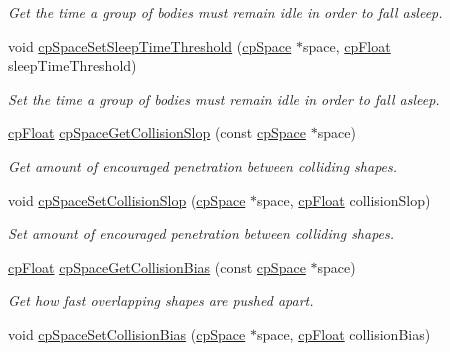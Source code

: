 \begin{DoxyCompactItemize}
\begin{DoxyCompactList}\small\item\em Get the time a group of bodies must remain idle in order to fall asleep. \end{DoxyCompactList}\item 
void \hyperlink{group__cp_space_ga96acf0e2cb7f180dc4a514db6e055bb5}{cp\+Space\+Set\+Sleep\+Time\+Threshold} (\hyperlink{structcp_space}{cp\+Space} $\ast$space, \hyperlink{group__basic_types_gac1ed65573e035bf892505768c852d8d3}{cp\+Float} sleep\+Time\+Threshold)
\begin{DoxyCompactList}\small\item\em Set the time a group of bodies must remain idle in order to fall asleep. \end{DoxyCompactList}\item 
\hyperlink{group__basic_types_gac1ed65573e035bf892505768c852d8d3}{cp\+Float} \hyperlink{group__cp_space_ga235cd69e2f133d8dfb6213018eea5b01}{cp\+Space\+Get\+Collision\+Slop} (const \hyperlink{structcp_space}{cp\+Space} $\ast$space)
\begin{DoxyCompactList}\small\item\em Get amount of encouraged penetration between colliding shapes. \end{DoxyCompactList}\item 
void \hyperlink{group__cp_space_gaaabdae358883644b1f619276cba26845}{cp\+Space\+Set\+Collision\+Slop} (\hyperlink{structcp_space}{cp\+Space} $\ast$space, \hyperlink{group__basic_types_gac1ed65573e035bf892505768c852d8d3}{cp\+Float} collision\+Slop)
\begin{DoxyCompactList}\small\item\em Set amount of encouraged penetration between colliding shapes. \end{DoxyCompactList}\item 
\hyperlink{group__basic_types_gac1ed65573e035bf892505768c852d8d3}{cp\+Float} \hyperlink{group__cp_space_ga32e35ab3bf128b560b3a1103fd2c644a}{cp\+Space\+Get\+Collision\+Bias} (const \hyperlink{structcp_space}{cp\+Space} $\ast$space)
\begin{DoxyCompactList}\small\item\em Get how fast overlapping shapes are pushed apart. \end{DoxyCompactList}\item 
void \hyperlink{group__cp_space_ga9bbaeb01dd9ef4fbe13cf99838e7c02a}{cp\+Space\+Set\+Collision\+Bias} (\hyperlink{structcp_space}{cp\+Space} $\ast$space, \hyperlink{group__basic_types_gac1ed65573e035bf892505768c852d8d3}{cp\+Float} collision\+Bias)

\end{DoxyCompactItemize}
